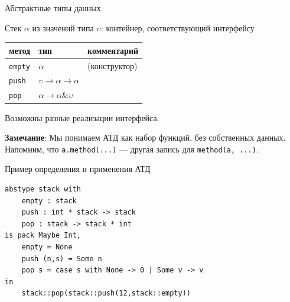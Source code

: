 \documentclass[aspectratio=169]{beamer}
\begin{document}
\begin{frame}[fragile]{Абстрактные типы данных}

	Стек $\alpha$ из значений типа $\upsilon$: контейнер, соответствующий интерфейсу

	\begin{center}\begin{tabular}{lll}
	метод & тип & комментарий\\\hline
	\verb!empty! & $\alpha$ & (конструктор)\\
	\verb!push! & $\upsilon \rightarrow \alpha \rightarrow \alpha$\\
	\verb!pop! & $\alpha \rightarrow \alpha \& \upsilon$
	\end{tabular}\end{center}

	Возможны разные реализации интерфейса.\vspace{0.5cm}

	\textbf{Замечание}:  Мы понимаем АТД как набор функций, без собственных данных.
	Напомним, что \verb!a.method(...)! --- другая запись для \verb!method(a, ...)!.
\end{frame}

\begin{frame}[fragile]{Пример определения и применения АТД}
\begin{verbatim}
abstype stack with 
    empty : stack
    push : int * stack -> stack
    pop : stack -> stack * int
is pack Maybe Int,
    empty = None
    push (n,s) = Some n
    pop s = case s with None -> 0 | Some v -> v
in
    stack::pop(stack::push(12,stack::empty))
\end{verbatim}
\end{frame}
\end{document}
